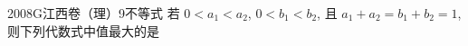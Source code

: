 
\begin{problem}{2008}{G}{江西卷（理）}{9}{不等式}
若 $ 0 < a_1 < a_2 $, $ 0 < b_1 < b_2 $, 且 $ a_1 + a_2 = b_1 + b_2 = 1 $, 则下列代数式中值最大的是
\begin{choices}
\end{choices}
\end{problem}

\begin{answer}

\end{answer}

\begin{solutions}

\end{solutions}